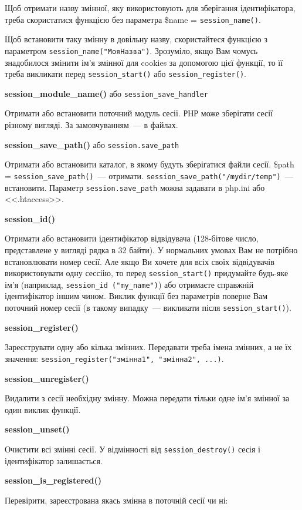 Щоб отримати назву змінної, яку використовують для зберігання ідентифікатора, треба скористатися функцією без параметра \$name = \verb'session_name()'.

Щоб встановити таку змінну в довільну назву, скористайтеся функцією з параметром \verb'session_name("МояНазва")'. Зрозуміло, якщо Вам чомусь знадобилося змінити ім'я змінної для cookies за допомогою цієї функції, то її треба викликати перед \verb'session_start()' або \verb'session_register()'.

\textbf{session\_module\_name()} або \verb'session_save_handler'

Отримати або встановити поточний модуль сесії. РНР може зберігати сесії різному вигляді. За замовчуванням~--- в файлах.

\textbf{session\_save\_path()} або \verb'session.save_path'

Отримати або встановити каталог, в якому будуть зберігатися файли сесії. \$path = \verb'session_save_path()'~--- отримати. \verb'session_save_path("/mydir/temp")'~--- встановити. Параметр \verb'session.save_path' можна задавати в php.ini або <<.htaccess>>. 

\textbf{session\_id()}

Отримати або встановити ідентифікатор відвідувача (128-бітове число, представлене у вигляді рядка в 32 байти). У нормальних умовах Вам не потрібно встановлювати номер сесії. Але якщо Ви хочете для всіх своїх відвідувачів використовувати одну сессіію, то перед \verb'session_start()' придумайте будь-яке ім'я (наприклад, \verb'session_id ("my_name")') або отримаєте справжній ідентифікатор іншим чином. Виклик функції без параметрів поверне Вам поточний номер сесії (в такому випадку~--- викликати після \verb'session_start()').

\textbf{session\_register()}

Зареєструвати одну або кілька змінних. Передавати треба імена змінних, а не їх значення: \verb'session_register("змінна1", "змінна2", ...)'. 

\textbf{session\_unregister()}

Видалити з сесії необхідну змінну. Можна передати тільки одне ім'я змінної за один виклик функції.

\textbf{session\_unset()}

Очистити всі змінні сесії. У відмінності від \verb'session_destroy()' сесія і ідентифікатор залишається.

\textbf{session\_is\_registered()}

Перевірити, зареєстрована якась змінна в поточній сесії чи ні:

